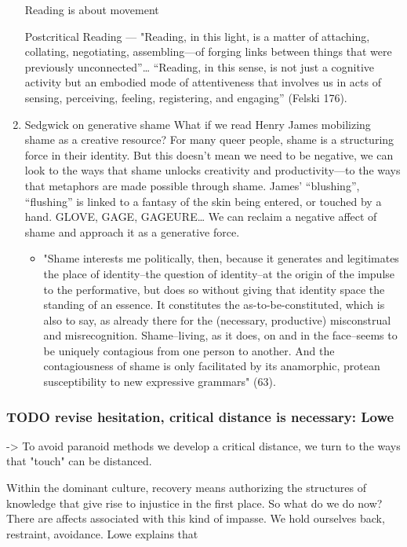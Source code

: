 \documentclass[11pt]{article}
\begin{document}
\begin{enumerate}
Reading is about movement 


Postcritical Reading --- "Reading, in this light, is a matter of
attaching, collating, negotiating, assembling—of forging links between
things that were previously unconnected”… “Reading, in this sense, is
not just a cognitive activity but an embodied mode of attentiveness
that involves us in acts of sensing, perceiving, feeling, registering,
and engaging” (Felski 176).

\item Sedgwick on generative shame
\label{sec:org3d1f85e}
What if we read Henry James mobilizing shame as a creative resource?
  For many queer people, shame is a structuring force in their
  identity. But this doesn’t mean we need to be negative, we can look
  to the ways that shame unlocks creativity and productivity---to the
  ways that metaphors are made possible through shame. James’
  “blushing”, “flushing” is linked to a fantasy of the skin being
  entered, or touched by a hand. GLOVE, GAGE, GAGEURE…  We can reclaim
  a negative affect of shame and approach it as a generative force.
\begin{itemize}
\item "Shame interests me politically, then, because it generates and
legitimates the place of identity--the question of identity--at the
origin of the impulse to the performative, but does so without
giving that identity space the standing of an essence. It
constitutes the as-to-be-constituted, which is also to say, as
already there for the (necessary, productive) misconstrual and
misrecognition. Shame--living, as it does, on and in the face--seems
to be uniquely contagious from one person to another. And the
contagiousness of shame is only facilitated by its anamorphic,
protean susceptibility to new expressive grammars" (63).
\end{itemize}
\end{enumerate}

\subsubsection{{\bfseries\sffamily TODO} revise hesitation, critical distance is necessary: Lowe}
\label{sec:org8d0a865}
-> To avoid paranoid methods we develop a critical distance, we turn to
the ways that "touch" can be distanced. 

Within the dominant culture, recovery means authorizing the structures
of knowledge that give rise to injustice in the first place. So what
do we do now? There are affects associated with this kind of
impasse. We hold ourselves back, restraint, avoidance. Lowe explains
that
\end{document}
